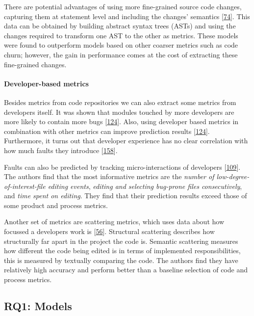 \documentclass[]{book}
\let\oldparagraph\paragraph
\renewcommand{\paragraph}[1]{\oldparagraph{#1}\mbox{}}
\begin{document}
There are potential advantages of using more fine-grained source code
changes, capturing them at statement level and including the changes'
semantics {[}\protect\hyperlink{ref-Giger2011}{74}{]}. This data can be
obtained by building abstract syntax trees (ASTs) and using the changes
required to transform one AST to the other as metrics. These models were
found to outperform models based on other coarser metrics such as code
churn; however, the gain in performance comes at the cost of extracting
these fine-grained changes.

\paragraph{Developer-based metrics}\label{developer-based-metrics}

Besides metrics from code repositories we can also extract some metrics
from developers itself. It was shown that modules touched by more
developers are more likely to contain more bugs
{[}\protect\hyperlink{ref-Matsumoto2010}{124}{]}. Also, using developer
based metrics in combination with other metrics can improve prediction
results {[}\protect\hyperlink{ref-Matsumoto2010}{124}{]}. Furthermore,
it turns out that developer experience has no clear correlation with how
much faults they introduce
{[}\protect\hyperlink{ref-rahman2011}{158}{]}.

Faults can also be predicted by tracking micro-interactions of
developers {[}\protect\hyperlink{ref-Lee2011}{109}{]}. The authors find
that the most informative metrics are the \emph{number of
low-degree-of-interest-file editing events}, \emph{editing and selecting
bug-prone files consecutively}, and \emph{time spent on editing}. They
find that their prediction results exceed those of some product and
process metrics.

Another set of metrics are scattering metrics, which uses data about how
focussed a developers work is
{[}\protect\hyperlink{ref-DiNucci2018}{56}{]}. Structural scattering
describes how structurally far apart in the project the code is.
Semantic scattering measures how different the code being edited is in
terms of implemented responsibilities, this is measured by textually
comparing the code. The authors find they have relatively high accuracy
and perform better than a baseline selection of code and process
metrics.

\subsection{RQ1: Models}\label{rq1-models}
\end{document}

